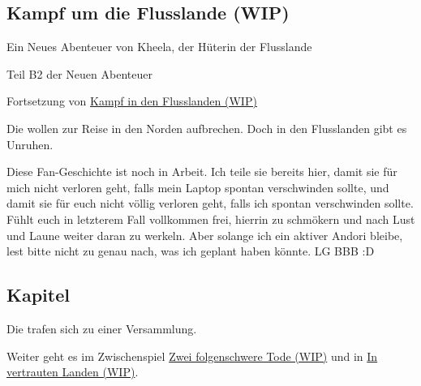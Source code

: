 \begin{chapterbox}
    \chapter{Kampf um die Flusslande (WIP)}
    \label{wip-kampf-um-die-flusslande}
    
    \begin{center}
        Ein Neues Abenteuer von Kheela, der Hüterin der Flusslande

        Teil B2 der Neuen Abenteuer

        Fortsetzung von \hyperref[wip-kampf-in-den-flusslanden]{Kampf in den Flusslanden (WIP)}
    \end{center}

    Die  wollen zur Reise in den Norden aufbrechen. Doch in den Flusslanden gibt es Unruhen.
\end{chapterbox}



Diese Fan-Geschichte ist noch in Arbeit. Ich teile sie bereits hier, damit sie für mich nicht verloren geht, falls mein Laptop spontan verschwinden sollte, und damit sie für euch nicht völlig verloren geht, falls ich spontan verschwinden sollte. Fühlt euch in letzterem Fall vollkommen frei, hierrin zu schmökern und nach Lust und Laune weiter daran zu werkeln. Aber solange ich ein aktiver Andori bleibe, lest bitte nicht zu genau nach, was ich geplant haben könnte. LG BBB :D




\newpage
\section{Kapitel}

Die  trafen sich zu einer Versammlung.




\begin{commentbox}
    Weiter geht es im Zwischenspiel \hyperref[wip-zwei-folgenschwere-tode]{Zwei folgenschwere Tode (WIP)} und in \hyperref[wip-in-vertrauten-landen]{In vertrauten Landen (WIP)}.
\end{commentbox}